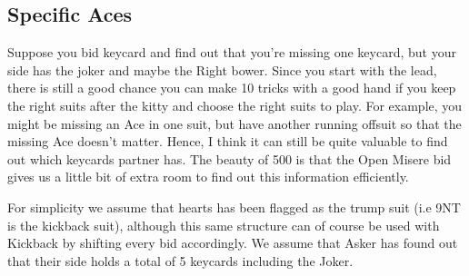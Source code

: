 \documentclass[a4paper]{JoshCards}
\begin{document}
\subsection*{Specific Aces}

Suppose you bid keycard and find out that you're missing one keycard, but your side has the joker and maybe the Right bower. Since you start with the lead, there is still a good chance you can make 10 tricks with a good hand if you keep the right suits after the kitty and choose the right suits to play. For example, you might be missing an Ace in one suit, but have another running offsuit so that the missing Ace doesn't matter. Hence, I think it can still be quite valuable to find out which keycards partner has. The beauty of 500 is that the Open Misere bid gives us a little bit of extra room to find out this information efficiently.

For simplicity we assume that hearts has been flagged as the trump suit (i.e 9NT is the kickback suit), although this same structure can of course be used with Kickback by shifting every bid accordingly. We assume that Asker has found out that their side holds a total of 5 keycards including the Joker.
\end{document}
